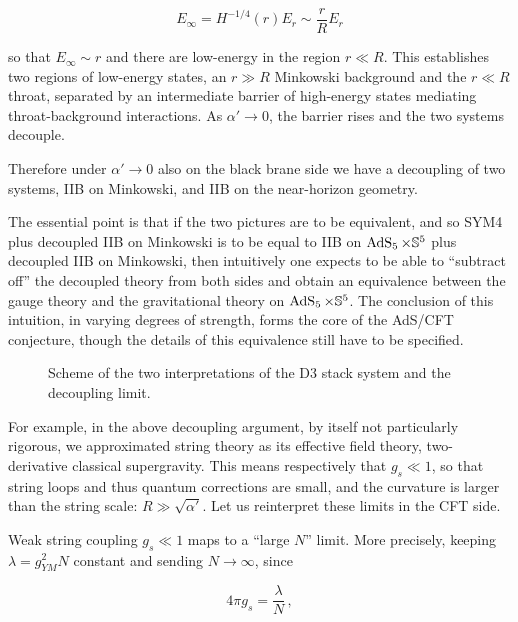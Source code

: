 \begin{equation}
	E_\infty = H^{-1/4}(r) E_r \sim \frac{r}{R} E_r
	\label{}
\end{equation}

so that $E_\infty \sim r$ and there are low-energy in the region $r \ll R$. This establishes two regions of low-energy states, an $r\gg R$ Minkowski background and the $r \ll R$ throat, separated by an intermediate barrier of high-energy states mediating throat-background interactions. As $\alpha' \rightarrow 0$, the barrier rises and the two systems decouple.

Therefore under $\alpha' \rightarrow 0$ also on the black brane side we have a decoupling of two systems, IIB on Minkowski, and IIB on the near-horizon geometry.

The essential point is that if the two pictures are to be equivalent, and so SYM4 plus decoupled IIB on Minkowski is to be equal to IIB on $\operatorname{AdS}_{5} \times \mathbb{S}^5$ plus decoupled IIB on Minkowski, then intuitively one expects to be able to ``subtract off'' the decoupled theory from both sides and obtain an equivalence between the gauge theory and the gravitational theory on $\operatorname{AdS}_{5} \times \mathbb{S}^5$. The conclusion of this intuition, in varying degrees of strength, forms the core of the AdS/CFT conjecture, though the details of this equivalence still have to be specified.

\begin{figure}[H]
\centering
\def\svgwidth{400pt}
\captionsetup{width=0.8\textwidth}

\caption{Scheme of the two interpretations of the D3 stack system and the decoupling limit.}
\end{figure}

For example, in the above decoupling argument, by itself not particularly rigorous, we approximated string theory as its effective field theory, two-derivative classical supergravity. This means respectively that $g_s \ll 1$, so that string loops and thus quantum corrections are small, and the curvature is larger than the string scale: $R \gg \sqrt {\alpha'}$. Let us reinterpret these limits in the CFT side.

Weak string coupling $g_s \ll 1$ maps to a ``large $N$'' limit. More precisely, keeping $\lambda = g_{YM}^2 N$ constant and sending $N \rightarrow \infty$, since

\begin{equation}
	4\pi g_s = \frac{\lambda}{N}\,,
	\label{}
\end{equation}

